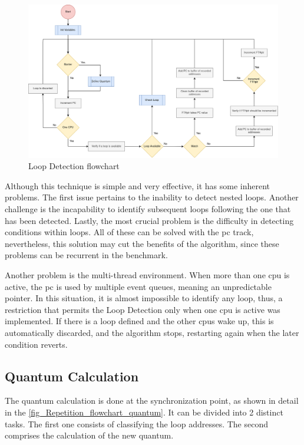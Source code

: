 \begin{figure}[h!]
	\centering
 	\includegraphics[width=0.9\linewidth]{Images/Repetition_flowchart.png}
 	\caption{Loop Detection flowchart}
	 \label{fig_Repetition_flowchart}
\end{figure}


Although this technique is simple and very effective, it has some inherent problems. The first issue pertains to the inability to detect 
nested loops. Another challenge is the incapability to identify subsequent loops following the one that has been detected. Lastly, the most crucial 
problem is the difficulty in detecting conditions within loops. All of these can be solved with the \gls{pc} track, nevertheless, this solution 
may cut the benefits of the algorithm, since these problems can be recurrent in the benchmark. 

Another problem is the multi-thread environment. When more than one \gls{cpu} is active, the \gls{pc} is used by multiple event queues, 
meaning an unpredictable pointer. In this situation, it is almost impossible to identify any loop, thus, a restriction that permits the Loop 
Detection only when one \gls{cpu} is active was implemented.   
If there is a loop defined and the other \glspl{cpu} wake up, this is automatically discarded, and the algorithm 
stops, restarting again when the later condition reverts. 

\subsection{Quantum Calculation}

The quantum calculation is done at the synchronization point, as shown in detail in the \autoref{fig_Repetition_flowchart_quantum}. 
It can be divided into 2 distinct tasks. The first one consists of classifying the loop addresses. The second comprises the calculation of 
the new quantum. 

